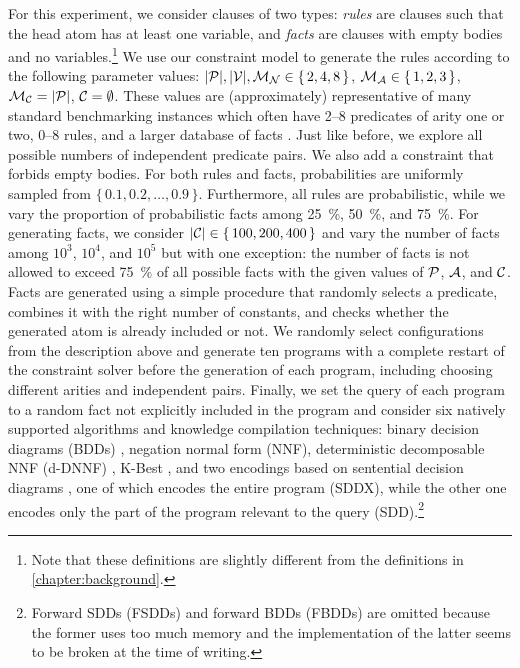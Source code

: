 For this experiment, we consider clauses of two types: \emph{rules} are clauses
such that the head atom has at least one variable, and \emph{facts} are clauses
with empty bodies and no variables.\footnote{Note that these definitions are
  slightly different from the definitions in \cref{chapter:background}.} We use
our constraint model to generate the rules according to the following parameter
values: $|\mathcal{P}{}|, |\mathcal{V}{}|, \mathcal{M}_{\mathcal{N}}{} \in \{\, 2, 4, 8 \,\}$,
$\mathcal{M}_{\mathcal{A}}{} \in \{\, 1, 2, 3 \,\}$, $\mathcal{M}_{\mathcal{C}}{} = |\mathcal{P}{}|$,
$\mathcal{C}{} = \emptyset$. These values are (approximately) representative of
many standard benchmarking instances which often have 2--8 predicates of arity
one or two, 0--8 rules, and a larger database of facts
\citep{DBLP:journals/tplp/FierensBRSGTJR15}. Just like before, we explore all
possible numbers of independent predicate pairs. We also add a constraint that
forbids empty bodies. For both rules and facts, probabilities are uniformly
sampled from $\{\, 0.1, 0.2, \dots, 0.9 \,\}$. Furthermore, all rules are
probabilistic, while we vary the proportion of probabilistic facts among
\SI{25}{\percent}, \SI{50}{\percent}, and \SI{75}{\percent}. For generating
facts, we consider $|\mathcal{C}{}| \in \{\, 100, 200, 400 \,\}$ and vary the
number of facts among $10^3$, $10^4$, and $10^5$ but with one exception: the
number of facts is not allowed to exceed \SI{75}{\percent} of all possible facts
with the given values of $\mathcal{P}{}$, $\mathcal{A}{}$, and $\mathcal{C}{}$.
Facts are generated using a simple procedure that randomly selects a predicate,
combines it with the right number of constants, and checks whether the generated
atom is already included or not. We randomly select configurations from the
description above and generate ten programs with a complete restart of the
constraint solver before the generation of each program, including choosing
different arities and independent pairs. Finally, we set the query of each
program to a random fact not explicitly included in the program and consider six
natively supported algorithms and knowledge compilation techniques: binary
decision diagrams (BDDs) \citep{DBLP:journals/tc/Bryant86}, negation normal form
(NNF), deterministic decomposable NNF (d-DNNF)
\citep{DBLP:journals/jair/DarwicheM02}, K-Best
\citep{DBLP:conf/ijcai/RaedtKT07}, and two encodings based on sentential
decision diagrams \citep{DBLP:conf/ijcai/Darwiche11}, one of which encodes the
entire program (SDDX), while the other one encodes only the part of the program
relevant to the query (SDD).\footnote{Forward SDDs (FSDDs) and forward BDDs
  (FBDDs) \citep{DBLP:conf/aaai/TsamouraGK20,DBLP:conf/ijcai/VlasselaerBKMR15}
  are omitted because the former uses too much memory and the implementation of
  the latter seems to be broken at the time of writing.}

